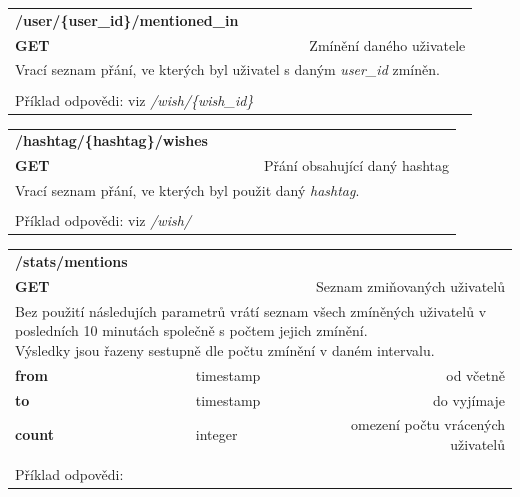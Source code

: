 \documentclass[thesis=B,czech]{FITthesis}[2012/06/26]
\begin{document}
\begin{table}[h]
\begin{tabular}{llllr}
\rowcolor[HTML]{EFEFEF}
\large \textbf{/user/\{user\_id\}/mentioned\_in}        &         &                 &        & \multicolumn{1}{l}{}                \\
\rowcolor[HTML]{EFEFEF}
\textbf{GET}          &         &                 &        & Zmínění daného uživatele                        \\
\multicolumn{5}{l}{\parbox[t]{12.8cm}{Vrací seznam přání, ve kterých byl uživatel s daným \textit{user\_id} zmíněn. }  } \\  
 & & & & \\
 Příklad odpovědi: viz \textit{/wish/\{wish\_id\}}
\end{tabular}
\end{table}


\begin{table}[h]
\begin{tabular}{llllr}
\rowcolor[HTML]{EFEFEF}
\large \textbf{/hashtag/\{hashtag\}/wishes}        &         &                 &        & \multicolumn{1}{l}{}                \\
\rowcolor[HTML]{EFEFEF}
\textbf{GET}          &         &                 &        & Přání obsahující daný hashtag                       \\
\multicolumn{5}{l}{\parbox[t]{12.8cm}{Vrací seznam přání, ve kterých byl použit daný \textit{hashtag}. }  } \\  
 & & & & \\
 Příklad odpovědi: viz \textit{/wish/}
\end{tabular}
\end{table}

\begin{table}[h]
\begin{tabular}{llllr}
\rowcolor[HTML]{EFEFEF}
\large \textbf{/stats/mentions}        &         &                 &        & \multicolumn{1}{l}{}                \\
\rowcolor[HTML]{EFEFEF}
\textbf{GET}          &         &                 &        & Seznam zmiňovaných uživatelů                        \\
\multicolumn{5}{l}{\parbox[t]{12.8cm}{Bez použití následujích parametrů vrátí seznam všech zmíněných uživatelů v posledních 10 minutách společně s počtem jejich zmínění. \\ Výsledky jsou řazeny sestupně dle počtu zmínění v daném intervalu. }  } \\
\textbf{from}         &         & timestamp       &        & od včetně                           \\
\textbf{to}           &         & timestamp       &        & do vyjímaje                         \\
\textbf{count}        &         & integer         &        & omezení počtu vrácených uživatelů     \\ 
 & & & & \\
 Příklad odpovědi:
\end{tabular}
\end{table}
\end{document}

